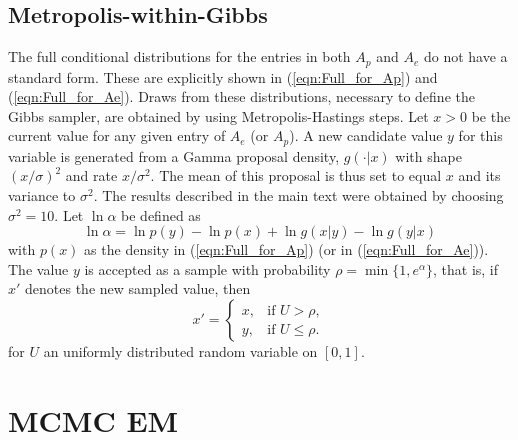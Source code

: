 \documentclass[11pt]{amsart}
\theoremstyle{definition}
\begin{document}
\subsection{Metropolis-within-Gibbs}\label{sec:MHsteps}
The full conditional distributions for the entries in both $A_p$ and
$A_e$ do not have a standard form. These are explicitly shown in
(\ref{eqn:Full_for_Ap}) and (\ref{eqn:Full_for_Ae}). Draws from these
distributions, necessary to define the Gibbs sampler,  are obtained by
using Metropolis-Hastings steps.  Let $x > 0$ be the current value
for any given entry of $A_e$ (or $A_p$). A new candidate value $y$ for
this variable is generated from a Gamma proposal density, $g(\cdot|
x)$ with shape $(x/\sigma)^2$ and rate $x/\sigma^2$. The mean of this
proposal is thus set to equal $x$ and its variance to $\sigma^2$. The
results described in the main text were obtained by choosing
$\sigma^2 = 10$. Let $\ln \alpha$ be defined as
\[
  \ln \alpha
 =
  \ln p(y) - \ln p(x) + \ln g(x|y) - \ln g(y|x)
\]
with $p(x)$ as the density in (\ref{eqn:Full_for_Ap}) (or in
(\ref{eqn:Full_for_Ae})). The value $y$ is accepted as a sample
with probability $\rho = \min\{1, e^{\alpha}\}$, that is, if $x'$
denotes the new sampled value, then
\[
   x'
    =
  \begin{cases}
    x, & \text{if } U > \rho,\\
    y, & \text{if } U \leq \rho.
  \end{cases}
\]
for $U$ an uniformly distributed random variable on $[0, 1]$.

\section{MCMC EM}
\end{document}
